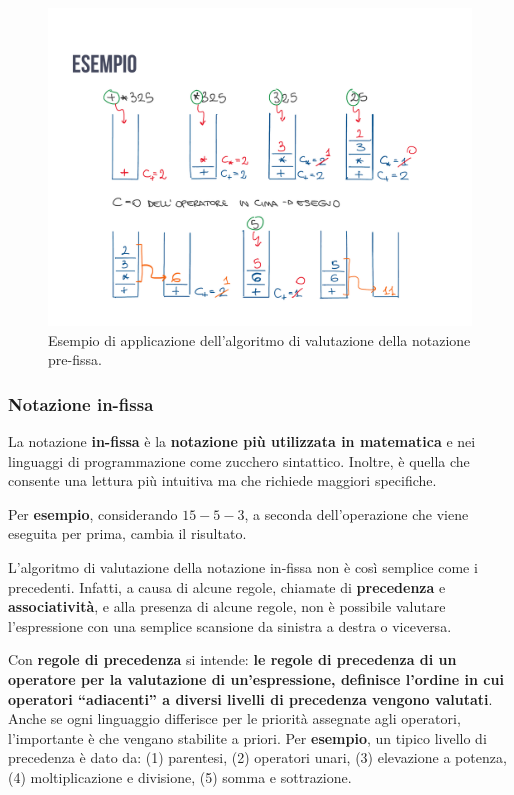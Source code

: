 \documentclass[a4paper]{article}
\newcommand{\dquotes}[1]{``#1''}
\begin{document}
	\begin{figure}[!htp]
		\centering
		\includegraphics[width=\textwidth]{img/esempio_notazione_pre-fissa.pdf}
		\caption{Esempio di applicazione dell'algoritmo di valutazione della notazione pre-fissa.}
	\end{figure}\newpage
	
	\subsubsection{Notazione in-fissa}\label{notazione in-fissa}
	
	La notazione \textcolor{Red3}{\textbf{in-fissa}} è la \textbf{notazione più utilizzata in matematica} e nei linguaggi di programmazione come zucchero sintattico. Inoltre, è quella che consente una lettura più intuitiva ma che richiede maggiori specifiche.\newline
	
	\noindent
	Per \textcolor{Green4}{\textbf{esempio}}, considerando $15-5-3$, a seconda dell'operazione che viene eseguita per prima, cambia il risultato.\newline
	
	\noindent
	L'algoritmo di valutazione della notazione in-fissa non è così semplice come i precedenti. Infatti, a causa di alcune regole, chiamate di \textbf{precedenza} e \textbf{associatività}, e alla presenza di alcune regole, non è possibile valutare l'espressione con una semplice scansione da sinistra a destra o viceversa.\newline
	
	\noindent
	Con \textcolor{Red3}{\textbf{regole di precedenza}} si intende: \textbf{le regole di precedenza di un operatore per la valutazione di un'espressione, definisce l'ordine in cui operatori \dquotes{adiacenti} a diversi livelli di precedenza vengono valutati}. Anche se ogni linguaggio differisce per le priorità assegnate agli operatori, l'importante è che vengano stabilite a priori. Per \textcolor{Green4}{\textbf{esempio}}, un tipico livello di precedenza è dato da: (1) parentesi, (2) operatori unari, (3) elevazione a potenza, (4) moltiplicazione e divisione, (5) somma e sottrazione.\newline
	
\end{document}
